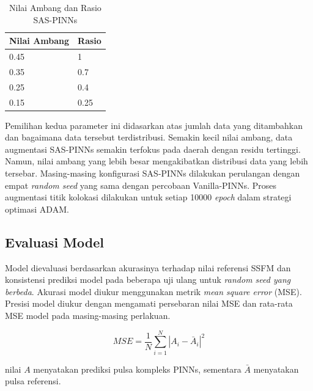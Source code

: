 \begin{table}[htbp]
    \centering
    \begin{threeparttable}
        \caption{Nilai Ambang dan Rasio SAS-PINNs}
        \begin{tabular}{|p{5cm}|p{4cm}|}
				\hline
				Nilai Ambang & Rasio \\
                \hline 
                0.45 & 1\\
                \hline
                0.35 & 0.7 \\
                \hline
                0.25 & 0.4 \\
                \hline
                0.15 & 0.25 \\
                \hline
			\end{tabular}
    \end{threeparttable}
\end{table} 

Pemilihan kedua parameter ini didasarkan atas jumlah data yang ditambahkan dan bagaimana data tersebut terdistribusi. Semakin kecil nilai ambang, data augmentasi SAS-PINNs semakin terfokus pada daerah dengan residu tertinggi. Namun, nilai ambang yang lebih besar mengakibatkan distribusi data yang lebih tersebar. Masing-masing konfigurasi SAS-PINNs dilakukan perulangan dengan empat \emph{random seed} yang sama dengan percobaan Vanilla-PINNs. Proses augmentasi titik kolokasi dilakukan untuk setiap 10000 \emph{epoch} dalam strategi optimasi ADAM. 


\subsection{Evaluasi Model}
Model dievaluasi berdasarkan akurasinya terhadap nilai referensi SSFM dan konsistensi prediksi model pada beberapa uji ulang untuk \emph{random seed yang berbeda}. Akurasi model diukur menggunakan metrik \emph{mean square error} (MSE). Presisi model diukur dengan mengamati persebaran nilai MSE dan rata-rata MSE model pada masing-masing perlakuan. 


\begin{equation}
    MSE = \frac{1}{N}\sum_{i=1}^N |A_i-\bar{A}_i|^2
\end{equation}

\noindent
nilai $A$ menyatakan prediksi pulsa kompleks PINNs, sementara $\bar{A}$ menyatakan pulsa referensi. 


